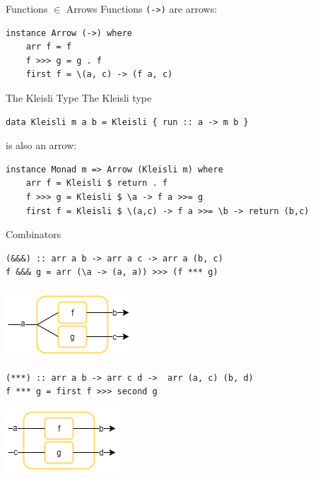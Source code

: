 \begin{frame}[fragile]{Functions $\in$ Arrows}
Functions \lstinline{(->)} are arrows:
\begin{lstlisting}[frame=htrbl]
instance Arrow (->) where
	arr f = f
	f >>> g = g . f
	first f = \(a, c) -> (f a, c)
\end{lstlisting}
\end{frame}

\begin{frame}[fragile]{The Kleisli Type}
The Kleisli type
\begin{lstlisting}[frame=htrbl]
data Kleisli m a b = Kleisli { run :: a -> m b }
\end{lstlisting}
is also an arrow:
\begin{lstlisting}[frame=htrbl]
instance Monad m => Arrow (Kleisli m) where
	arr f = Kleisli $ return . f
	f >>> g = Kleisli $ \a -> f a >>= g
	first f = Kleisli $ \(a,c) -> f a >>= \b -> return (b,c)
\end{lstlisting}
\end{frame}

\begin{frame}[fragile]{Combinators}
\begin{lstlisting}[frame=htrbl]
(&&&) :: arr a b -> arr a c -> arr a (b, c)
f &&& g = arr (\a -> (a, a)) >>> (f *** g)
\end{lstlisting}
\begin{center}
	\includegraphics[scale=0.6]{images/dollardollardollar}
\end{center}
\begin{lstlisting}[frame=htrbl]
(***) :: arr a b -> arr c d ->	arr (a, c) (b, d)
f *** g = first f >>> second g
\end{lstlisting}
\begin{center}
	\includegraphics[scale=0.6]{images/starstarstar}
\end{center}
\end{frame}

